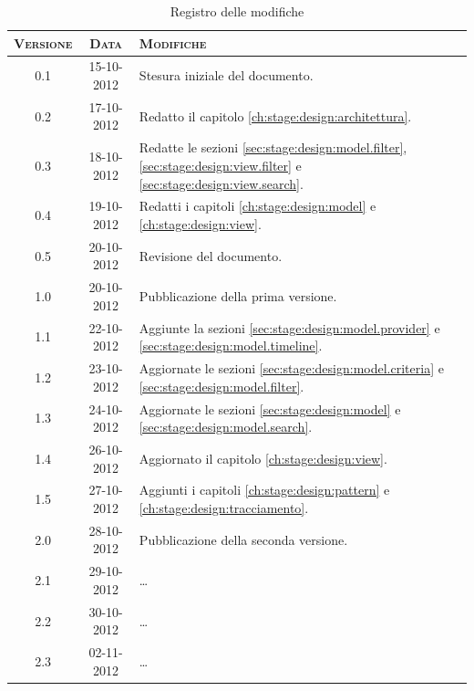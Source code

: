 \documentclass[10pt,a4paper,headinclude,footinclude,hidelinks]{scrreprt} %
\begin{document}
    \title{\rmfamily\normalfont{}}
    \author{}
    \date{\today}
    
    \maketitle
    
    \begin{abstract}
        \noindent Il documento riporta le informazioni di progettazione riguardanti l'interfaccia grafica per la visualizzazione e la navigazione dei contenuti.
    \end{abstract}
    
	\begin{table}[ht]
	\centering
	\begin{tabular}{|c|c|l|}
	\hline
	\textsc{Versione} & \textsc{Data} & \textsc{Modifiche} \\ \hline
	0.1 & 15-10-2012 & Stesura iniziale del documento. \\ \hline
	0.2 & 17-10-2012 & Redatto il capitolo \ref{ch:stage:design:architettura}. \\ \hline
	0.3 & 18-10-2012 & Redatte le sezioni \ref{sec:stage:design:model.filter}, \ref{sec:stage:design:view.filter} e \ref{sec:stage:design:view.search}. \\ \hline
	0.4 & 19-10-2012 & Redatti i capitoli \ref{ch:stage:design:model} e \ref{ch:stage:design:view}. \\ \hline
	0.5 & 20-10-2012 & Revisione del documento. \\ \hline
	1.0 & 20-10-2012 & Pubblicazione della prima versione. \\ \hline
	1.1 & 22-10-2012 & Aggiunte la sezioni \ref{sec:stage:design:model.provider} e \ref{sec:stage:design:model.timeline}. \\ \hline
	1.2 & 23-10-2012 & Aggiornate le sezioni \ref{sec:stage:design:model.criteria} e \ref{sec:stage:design:model.filter}. \\ \hline
	1.3 & 24-10-2012 & Aggiornate le sezioni \ref{sec:stage:design:model} e \ref{sec:stage:design:model.search}. \\ \hline
	1.4 & 26-10-2012 & Aggiornato il capitolo \ref{ch:stage:design:view}. \\ \hline
	1.5 & 27-10-2012 & Aggiunti i capitoli \ref{ch:stage:design:pattern} e \ref{ch:stage:design:tracciamento}. \\ \hline
	2.0 & 28-10-2012 & Pubblicazione della seconda versione. \\ \hline
	2.1 & 29-10-2012 & \ldots \\ \hline
	2.2 & 30-10-2012 & \ldots \\ \hline
	2.3 & 02-11-2012 & \ldots \\ \hline
	\end{tabular}
	\caption{Registro delle modifiche}
	\label{tab:stage:wp:workload}
	\end{table}
\end{document}
